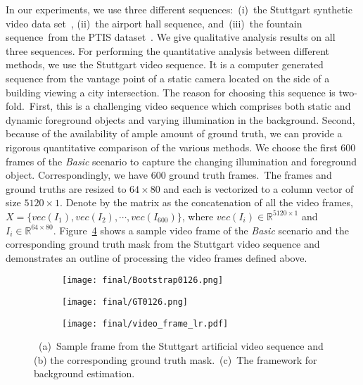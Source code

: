 \documentclass[twoside,11pt]{article}
\begin{document}
In our experiments, we use three different sequences:~(i)~the Stuttgart synthetic video data set~\citep{cvpr11brutzer}, (ii)~the airport hall sequence, and~(iii)~the fountain sequence~from the PTIS dataset~\citep{PTIS}. We give qualitative analysis results on all three sequences. For performing the quantitative analysis between different methods, we use the Stuttgart video sequence. It is a computer generated sequence from the vantage point of a static camera located on the side of a building viewing a city intersection. The reason for choosing this sequence is two-fold.~First, this is a challenging video sequence which comprises both static and dynamic foreground objects and varying illumination in the background. Second, because of the availability of ample amount of ground truth, we can provide a rigorous quantitative comparison of the various methods. We choose the first 600 frames of the {\it Basic} scenario to capture the changing illumination and foreground object. Correspondingly, we have 600 ground truth frames.~The frames and ground truths are resized to  $64\times80$ and each is vectorized to a column vector of size $5120\times1$. Denote by the matrix as the concatenation of all the video frames, $X=\{vec(I_1),vec(I_2),\cdots,vec(I_{600})\}$, where $vec(I_i)\in\mathbb{R}^{5120\times 1}$ and $I_i\in\mathbb{R}^{64\times 80}$. Figure~\ref{video_frame} shows a sample video frame of the {\it Basic} scenario and the corresponding ground truth mask from the Stuttgart video sequence and demonstrates an outline of processing the video frames defined above. 
\begin{figure}
	\begin{minipage}{0.4\textwidth}
		\centering
		\begin{subfigure}{\textwidth}
			\texttt{[image: final/Bootstrap0126.png]}
			\caption{}\label{fig:leftA}
		\end{subfigure}
		\begin{subfigure}{\textwidth}
			\texttt{[image: final/GT0126.png]}
			\caption{}\label{fig:leftB}
		\end{subfigure}
	\end{minipage}\hfill
	\begin{minipage}{0.55\textwidth}
		\centering
		\begin{subfigure}{\textwidth}
			\texttt{[image: final/video\_frame\_lr.pdf]}
			\caption{}\label{fig:rightA}
		\end{subfigure}
	\end{minipage}
	\caption{~(a)~Sample frame from the Stuttgart artificial video sequence and (b) the corresponding ground truth mask.~(c)~The framework for background estimation.}\label{video_frame}
\end{figure}
\end{document}

